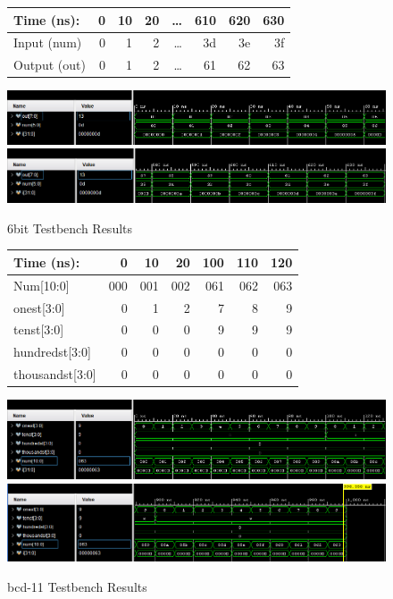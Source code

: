 \documentclass[11pt]{article}
\begin{document}
\begin{figure}[ht]\centering
	\begin{tabular}{l|rrrrrrr}
		Time (ns): & 0 & 10 & 20 & … & 610 & 620 & 630 \\
		\midrule
		Input (num) & 0 & 1 & 2 & … & 3d & 3e & 3f \\
		\midrule
		Output (out) & 0 & 1 & 2 & … & 61 & 62 & 63 \\
		\bottomrule
	\end{tabular}\medskip

	 \includegraphics[width=1.1\textwidth]{6bit_test.png}
	 \includegraphics[width=1.1\textwidth]{6bittestend.png}
	 \caption{6bit Testbench Results}
	 \label{fig:6bit Testbench Waveform}

\end{figure}


\begin{figure}[ht]\centering
	\begin{tabular}{l|rrrrrr}
		Time (ns): & 0 & 10 & 20 & 100 & 110 & 120        \\
		\midrule
		Num[10:0] & 000 & 001 & 002 & 061 & 062 & 063      \\
		\midrule
		onest[3:0] & 0 & 1 & 2 & 7 & 8 & 9    \\
		tenst[3:0] & 0 & 0 & 0 & 9 & 9 & 9            \\
		hundredst[3:0] & 0 & 0 & 0 & 0 & 0 & 0 \\
		thousandst[3:0] & 0 & 0 & 0 & 0 & 0 & 0 \\
		
		\bottomrule
		
	\end{tabular}\medskip
	
	\includegraphics[width=1.1\textwidth]{bcd11_4.png}
	 \includegraphics[width=1.1\textwidth]{bcd11_3.png} 
	 \caption{bcd-11 Testbench Results}
	 \label{fig:sim_with_table}
	
\end{figure}
\end{document}
